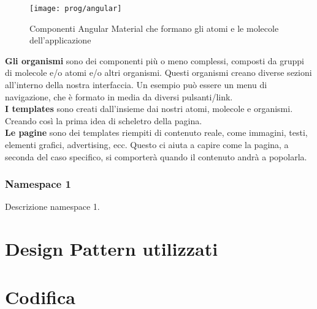 \begin{figure}[!h] 
	\centering 
	\texttt{[image: prog/angular]} 
	\caption{Componenti Angular Material che formano gli atomi e le molecole dell'applicazione}
\end{figure} 

\textbf{Gli organismi} sono dei componenti più o meno complessi, composti da gruppi di molecole e/o atomi e/o altri organismi. Questi organismi creano diverse sezioni all'interno della nostra interfaccia. Un esempio può essere un menu di navigazione, che è formato in media da diversi pulsanti/link. 
\\

\textbf{I templates} sono creati dall'insieme dai nostri atomi, molecole e organismi. Creando così la prima idea di scheletro della pagina.
\\

\textbf{Le pagine} sono dei templates riempiti di contenuto reale, come immagini, testi, elementi grafici, advertising, ecc. Questo ci aiuta a capire come la pagina, a seconda del caso specifico, si comporterà quando il contenuto andrà a popolarla. 
\subsubsection{Namespace 1} %
Descrizione namespace 1.

\begin{namespacedesc}
\end{namespacedesc}


\section{Design Pattern utilizzati}

\section{Codifica}

